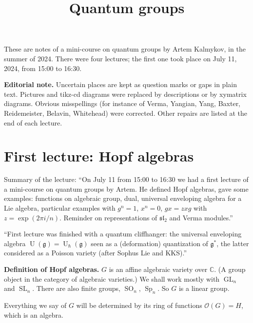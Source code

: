 



\title{Quantum groups}
\maketitle

\label{section-phantom}

\tableofcontents

\noindent
These are notes of a
mini-course on quantum groups by Artem
Kalmykov, in the summer of 2024. There
were four lectures; the first one took
place on July 11, 2024, from 15:00 to
16:30.

\medskip\noindent
{\bf Editorial note.}
Uncertain places are kept as question
marks or gaps in plain text. Pictures and tikz-cd diagrams
were replaced by descriptions or by
xymatrix diagrams. Obvious misspellings
(for instance of Verma, Yangian, Yang,
Baxter, Reidemeister, Belavin, Whitehead)
were corrected. Other repairs are listed
at the end of each lecture.

\section{First lecture: Hopf algebras}
\label{section-first-lecture}

\noindent
Summary of the lecture:
``On July 11 from 15:00 to 16:30 we had
a first lecture of a mini-course on
quantum groups by Artem. He defined Hopf
algebras, gave some examples: functions
on algebraic group, dual, universal
enveloping algebra for a Lie algebra,
particular examples with $g^n=1$,
$x^n=0$, $gx = z xg$ with
$z = \exp(2\pi i/n)$. Reminder on
representations of $\mathfrak{sl}_{2}$ and
Verma modules.''

\medskip\noindent
``First lecture was finished with a
quantum cliffhanger: the universal
enveloping algebra
$\operatorname{U}(\mathfrak{g}) =
\operatorname{U}_{\hbar}(\mathfrak{g})$
seen as a (deformation) quantization of
$\mathfrak{g}^*$, the latter considered
as a Poisson variety (after Sophus Lie
and KKS).''

\medskip\noindent
{\bf Definition of Hopf algebras.}
$G$ is an affine algebraic variety over
$\mathbb{C}$. (A group object in the
category of algebraic varieties.)
We shall work mostly with
$\operatorname{GL}_{n}$ and
$\operatorname{SL}_{n}$. There are also
finite groups, $\operatorname{SO}_{n}$,
$\operatorname{Sp}_{n}$. So $G$ is a
linear group.

Everything we say of $G$ will be
determined by its ring of functions
$\mathcal{O}(G)=H$, which is an algebra.

